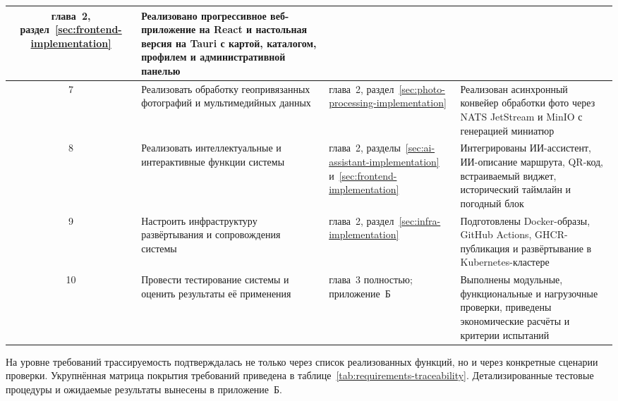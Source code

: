 \begin{longtable}{|c|p{5.0cm}|p{4.0cm}|p{5.0cm}|}
глава~2, раздел~\ref{sec:frontend-implementation} & Реализовано прогрессивное веб-приложение на React и настольная версия на Tauri
с картой, каталогом, профилем и административной панелью \\
\hline
7 & Реализовать обработку геопривязанных фотографий и мультимедийных данных &
глава~2, раздел~\ref{sec:photo-processing-implementation} & Реализован асинхронный конвейер обработки фото через
NATS JetStream и MinIO с генерацией миниатюр \\
\hline
8 & Реализовать интеллектуальные и интерактивные функции системы &
глава~2, разделы~\ref{sec:ai-assistant-implementation} и~\ref{sec:frontend-implementation} & Интегрированы ИИ-ассистент, ИИ-описание маршрута,
QR-код, встраиваемый виджет, исторический таймлайн и погодный блок \\
\hline
9 & Настроить инфраструктуру развёртывания и сопровождения системы &
глава~2, раздел~\ref{sec:infra-implementation} & Подготовлены Docker-образы, GitHub Actions,
GHCR-публикация и развёртывание в Kubernetes-кластере \\
\hline
10 & Провести тестирование системы и оценить результаты её применения &
глава~3 полностью; приложение~Б & Выполнены модульные, функциональные и
нагрузочные проверки, приведены экономические расчёты и критерии испытаний \\
\hline
\end{longtable}

На уровне требований трассируемость подтверждалась не только через список
реализованных функций, но и через конкретные сценарии проверки. Укрупнённая
матрица покрытия требований приведена в таблице~\ref{tab:requirements-traceability}.
Детализированные тестовые процедуры и ожидаемые результаты вынесены в
приложение~Б.

